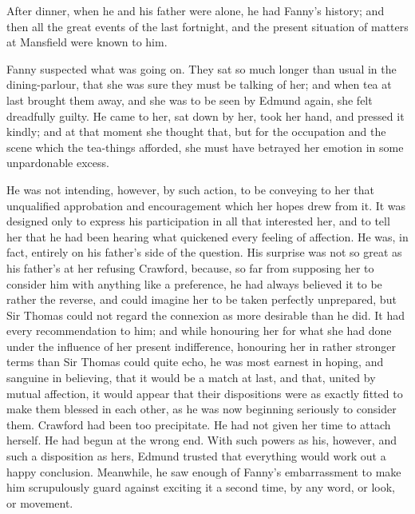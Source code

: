 After dinner, when he and his father were alone,
he had Fanny's history; and then all the great events
of the last fortnight, and the present situation
of matters at Mansfield were known to him.

Fanny suspected what was going on.  They sat so much
longer than usual in the dining-parlour, that she was sure
they must be talking of her; and when tea at last brought
them away, and she was to be seen by Edmund again, she felt
dreadfully guilty.  He came to her, sat down by her,
took her hand, and pressed it kindly; and at that moment
she thought that, but for the occupation and the scene
which the tea-things afforded, she must have betrayed
her emotion in some unpardonable excess.

He was not intending, however, by such action,
to be conveying to her that unqualified approbation
and encouragement which her hopes drew from it.
It was designed only to express his participation in all
that interested her, and to tell her that he had been
hearing what quickened every feeling of affection.  He was,
in fact, entirely on his father's side of the question.
His surprise was not so great as his father's at her
refusing Crawford, because, so far from supposing
her to consider him with anything like a preference,
he had always believed it to be rather the reverse,
and could imagine her to be taken perfectly unprepared,
but Sir Thomas could not regard the connexion as more
desirable than he did.  It had every recommendation to him;
and while honouring her for what she had done under the
influence of her present indifference, honouring her in
rather stronger terms than Sir Thomas could quite echo,
he was most earnest in hoping, and sanguine in believing,
that it would be a match at last, and that, united by
mutual affection, it would appear that their dispositions
were as exactly fitted to make them blessed in each other,
as he was now beginning seriously to consider them.
Crawford had been too precipitate.  He had not given her
time to attach herself.  He had begun at the wrong end.
With such powers as his, however, and such a disposition
as hers, Edmund trusted that everything would work
out a happy conclusion.  Meanwhile, he saw enough
of Fanny's embarrassment to make him scrupulously guard
against exciting it a second time, by any word, or look,
or movement.

